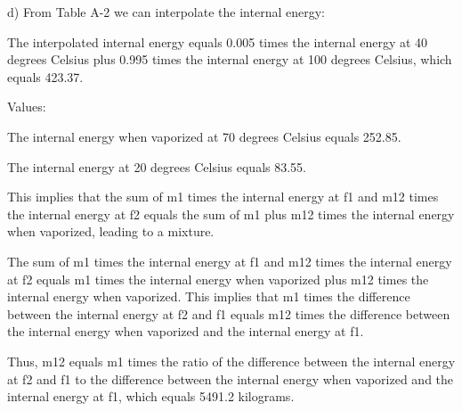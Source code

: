 d) From Table A-2 we can interpolate the internal energy:

The interpolated internal energy equals 0.005 times the internal energy at 40 degrees Celsius plus 0.995 times the internal energy at 100 degrees Celsius, which equals 423.37.

Values:

The internal energy when vaporized at 70 degrees Celsius equals 252.85.

The internal energy at 20 degrees Celsius equals 83.55.

This implies that the sum of m1 times the internal energy at f1 and m12 times the internal energy at f2 equals the sum of m1 plus m12 times the internal energy when vaporized, leading to a mixture.

The sum of m1 times the internal energy at f1 and m12 times the internal energy at f2 equals m1 times the internal energy when vaporized plus m12 times the internal energy when vaporized. This implies that m1 times the difference between the internal energy at f2 and f1 equals m12 times the difference between the internal energy when vaporized and the internal energy at f1.

Thus, m12 equals m1 times the ratio of the difference between the internal energy at f2 and f1 to the difference between the internal energy when vaporized and the internal energy at f1, which equals 5491.2 kilograms.